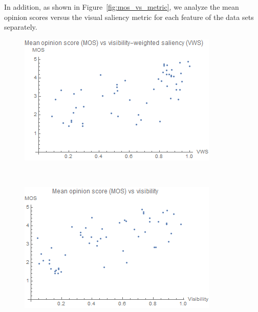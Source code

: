 In addition, as shown in Figure~\ref{fig:mos_vs_metric}, we analyze the mean opinion scores versus the visual saliency metric for each feature of the data sets separately.

\begin{figure}
	\centering
	\begin{minipage}{.33\textwidth}
		\includegraphics[width=1\linewidth]{images/mos_vs_vws.png}
	\end{minipage}~
	\begin{minipage}{.33\textwidth}
		\includegraphics[width=1\linewidth]{images/mos_vs_visibility}
	\end{minipage}~
	\begin{minipage}{.33\textwidth}

\end{minipage}
\end{figure}
